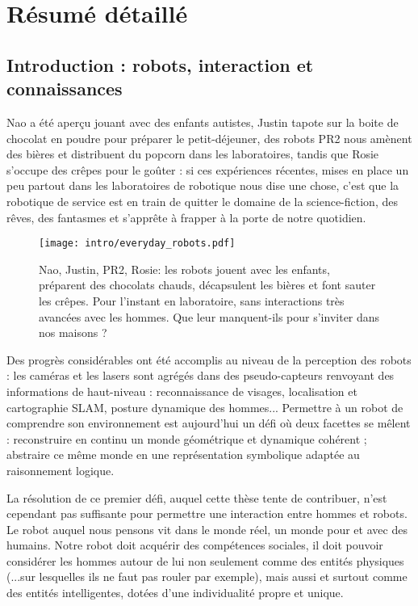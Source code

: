 \chapter{Résumé détaillé}


\section{Introduction : robots, interaction et connaissances}
\label{chapt|introduction}

Nao a été aperçu jouant avec des enfants autistes, Justin tapote sur la boite
de chocolat en poudre pour préparer le petit-déjeuner, des robots PR2 nous
amènent des bières et distribuent du popcorn dans les laboratoires, tandis que
Rosie s'occupe des crêpes pour le goûter : si ces expériences récentes, mises
en place un peu partout dans les laboratoires de robotique nous dise une chose,
c'est que la robotique de service est en train de quitter le domaine de la
science-fiction, des rêves, des fantasmes et s'apprête à frapper à la porte de
notre quotidien.

\begin{figure}[!h]
    \centering
    \texttt{[image: intro/everyday\_robots.pdf]}

    \caption*{Nao, Justin, PR2, Rosie: les robots jouent avec les enfants,
    préparent des chocolats chauds, décapsulent les bières et font sauter les
crêpes. Pour l'instant en laboratoire, sans interactions très avancées avec les
hommes. Que leur manquent-ils pour s'inviter dans nos maisons ?}

    \label{fig|everyday-robots}
\end{figure}

Des progrès considérables ont été accomplis au niveau de la perception des
robots : les caméras et les lasers sont agrégés dans des pseudo-capteurs
renvoyant des informations de haut-niveau : reconnaissance de visages,
localisation et cartographie SLAM, posture dynamique des hommes... Permettre à
un robot de comprendre son environnement est aujourd'hui un défi où deux
facettes se mêlent : reconstruire en continu un monde géométrique et dynamique
cohérent ; abstraire ce même monde en une représentation symbolique adaptée au
raisonnement logique.

La résolution de ce premier défi, auquel cette thèse tente de contribuer, n'est
cependant pas suffisante pour permettre une interaction entre hommes et robots.
Le robot auquel nous pensons vit dans le monde réel, un monde pour et avec des
humains. Notre robot doit acquérir des compétences sociales, il doit pouvoir
considérer les hommes autour de lui non seulement comme des entités physiques
(...sur lesquelles ils ne faut pas rouler par exemple), mais aussi et surtout
comme des entités intelligentes, dotées d'une individualité propre et unique.

